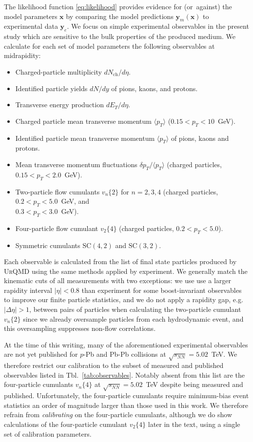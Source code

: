 \documentclass[aps,prc,reprint,amsmath,nofootinbib]{revtex4-1}
\newcommand{\sqrts}{\sqrt{s_{NN}}}
\newcommand{\nch}{N_\text{ch}}
\newcommand{\x}{\mathbf{x}}
\newcommand{\y}{\mathbf{y}}
\newcommand{\vnk}[2]{v_#1\{#2\}}
\def\\#1{ #1}
\begin{document}
The likelihood function \eqref{eq:likelihood} provides evidence for \mbox{(or against)} the model parameters $\x$ by comparing the model predictions $\y_m(\x)$ to experimental data $\y_e$.
We focus on simple experimental observables in the present study which are sensitive to the bulk properties of the produced medium.
We calculate for each set of model parameters the following observables at midrapidity:
\begin{itemize}[leftmargin=1\parindent, itemsep=0pt]
  \item Charged-particle multiplicity $d\nch/d\eta$.
  \item Identified particle yields $dN/dy$ of pions, kaons, and protons.
  \item Transverse energy production $dE_T/d\eta$.
  \item Charged particle mean transverse momentum $\langle p_T \rangle$ ($0.15 < p_T < 10$~GeV).
  \item Identified particle mean transverse momentum $\langle p_T \rangle$ of pions, kaons and protons.
  \item Mean transverse momentum fluctuations $\delta p_T / \langle p_T \rangle$ (charged particles, $0.15 < p_T < 2.0$~GeV).
  \item Two-particle flow cumulants $\vnk{n}{2}$ for $n=2,3,4$\\ (charged particles, $0.2 < p_T < 5.0$~GeV, and \\$0.3 < p_T < 3.0$~GeV).
  \item Four-particle flow cumulant $\vnk{2}{4}$ \\(charged particles, $0.2 < p_T < 5.0$).
  \item Symmetric cumulants $\mathrm{SC}(4, 2)$ and $\mathrm{SC}(3,2)$.
\end{itemize}
Each observable is calculated from the list of final state particles produced by \textsc{UrQMD} using the same methods applied by experiment.
We generally match the kinematic cuts of all measurements with two exceptions: we use use a larger rapidity interval $|\eta| < 0.8$ than experiment for some boost-invariant observables to improve our finite particle statistics, and we do not apply a rapidity gap, e.g.\ $|\Delta \eta| > 1$, between pairs of particles when calculating the two-particle cumulant $\vnk{n}{2}$ since we already oversample particles from each hydrodynamic event, and this oversampling suppresses non-flow correlations.

At the time of this writing, many of the aforementioned experimental observables are not yet published for $p$-Pb and Pb-Pb collisions at $\sqrts=5.02$~TeV.
We therefore restrict our calibration to the subset of measured and published observables listed in Tbl.~\ref{tab:observables}.
Notably absent from this list are the four-particle cumulants $\vnk{n}{4}$ at $\sqrts=5.02$~TeV despite being measured and published.
Unfortunately, the four-particle cumulants require minimum-bias event statistics an order of magnitude larger than those used in this work.
We therefore refrain from \emph{calibrating} on the four-particle cumulants, although we do show calculations of the four-particle cumulant $\vnk{2}{4}$ later in the text, using a single set of calibration parameters.
\end{document}
